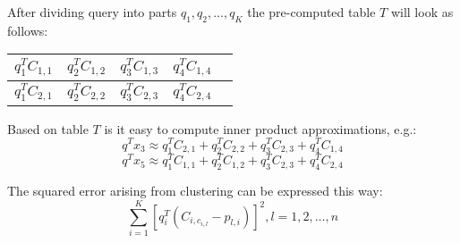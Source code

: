 \smallskip

After dividing query into parts $q_1, q_2, \ldots, q_K$ the pre-computed table $T$ will look as follows:
\renewcommand{\arraystretch}{1.6}
\begin{center}
\begin{tabular}{|c|c|c|c|c|}
\hline
$ q_1^T C_{1,1} $ & $ q_2^T C_{1,2} $ & $ q_3^T C_{1,3} $ & $ q_4^T C_{1,4} $ \\
\hline
$ q_1^T C_{2,1} $ & $ q_2^T C_{2,2} $ & $ q_3^T C_{2,3} $ & $ q_4^T C_{2,4} $\\
\hline
\end{tabular}
\end{center}

\smallskip

Based on table $T$ is it easy to compute inner product approximations, e.g.:
\[ q^T x_3 \approx q_1^T C_{2,1} + q_2^T C_{2,2} + q_3^T C_{2,3} + q_4^T C_{1,4} \]
\[ q^T x_5 \approx q_1^T C_{1,1} + q_2^T C_{1,2} + q_3^T C_{2,3} + q_4^T C_{2,4} \]

The squared error arising from clustering can be expressed this way:
$$ \sum_{i=1}^{K}  [q_{i}^{T} (C_{i, c_{i,l}} - p_{l,i})]^2, l = 1, 2, \ldots, n$$
